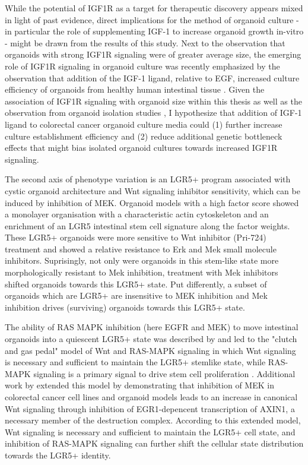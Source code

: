 \begin{flushleft}
While the potential of IGF1R as a target for therapeutic discovery appears mixed in light of past evidence, direct implications for the method of organoid culture - in particular the role of supplementing IGF-1 to increase organoid growth in-vitro - might be drawn from the results of this study. Next to the observation that organoids with strong IGF1R signaling were of greater average size, the emerging role of IGF1R signaling in organoid culture was recently emphasized by the observation that addition of the IGF-1 ligand, relative to EGF, increased culture efficiency of organoids from healthy human intestinal tissue \citep{fujiiHumanIntestinalOrganoids2018a}. Given the association of IGF1R signaling with organoid size within this thesis as well as the observation from organoid isolation studies \citep{fujiiHumanIntestinalOrganoids2018a}, I hypothesize that addition of IGF-1 ligand to colorectal cancer organoid culture media could (1) further increase culture establishment efficiency and (2) reduce additional genetic bottleneck effects that might bias isolated organoid cultures towards increased IGF1R signaling.
\bigbreak

The second axis of phenotype variation is an LGR5+ program associated with cystic organoid architecture and Wnt signaling inhibitor sensitivity, which can be induced by inhibition of MEK. Organoid models with a high factor score showed a monolayer organisation with a characteristic actin cytoskeleton and an enrichment of an LGR5 intestinal stem cell signature along the factor weights. These LGR5+ organoids were more sensitive to Wnt inhibitor (Pri-724) treatment and showed a relative resistance to Erk and Mek small molecule inhibitors. Suprisingly, not only were organoids in this stem-like state more morphologically resistant to Mek inhibition, treatment with Mek inhibitors shifted organoids towards this LGR5+ state. Put differently, a subset of organoids which are LGR5+ are insensitive to MEK inhibition and Mek inhibition drives (surviving) organoids towards this LGR5+ state.
\smallbreak

The ability of RAS MAPK inhibition (here EGFR and MEK) to move intestinal organoids into a quiescent LGR5+ state was described by \citep{basakInducedQuiescenceLgr52017c} and led to the "clutch and gas pedal" model of Wnt and RAS-MAPK signaling in which Wnt signaling is necessary and sufficient to maintain the LGR5+ stemlike state, while RAS-MAPK signaling is a primary signal to drive stem cell proliferation \citep{basakInducedQuiescenceLgr52017c}. Additional work by \citep{zhanMEKInhibitorsActivate2019a} extended this model by demonstrating that inhibition of MEK in colorectal cancer cell lines and organoid models leads to an increase in canonical Wnt signaling through inhibition of EGR1-depencent transcription of AXIN1, a necessary member of the destruction complex. According to this extended model, Wnt signaling is necessary and sufficient to maintain the LGR5+ cell state, and inhibition of RAS-MAPK signaling can further shift the cellular state distribution towards the LGR5+ identity. 
\smallbreak


\end{flushleft}
